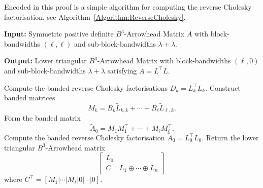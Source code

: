 \documentclass[hidelinks,onefignum,onetabnum]{siamart220329}
\def\algref#1{Algorithm~\ref{Algorithm:#1}}
\begin{document}
Encoded in this proof is a simple algorithm for computing the reverse Cholesky factorisation, see \algref{ReverseCholesky}. 



\begin{algorithm}[tb]
\caption{Reverse Cholesky for $B^3$-Arrowhead Matrices}\label{Algorithm:ReverseCholesky}

{\noindent\bf Input:} {Symmetric positive definite $B^3$-Arrowhead Matrix $A$ with block-bandwidths $(\ell,\ell)$ and sub-block-bandwidths $\lambda+\lambda$.}

{\noindent\bf Output:} {Lower triangular $B^3$-Arrowhead Matrix with block-bandwidths $(\ell,0)$ and sub-block-bandwidths $\lambda+\lambda$ satisfying $A = L^\top L$.}

\begin{algorithmic}[1]
\STATE Compute the banded reverse Cholesky factorisations $D_k = L_k^\top L_k$.
\ENDFOR
{}
\STATE Construct banded matrices 
\[
	M_k = B_k  \tilde L_{k,k} + \cdots + B_\ell \tilde L_{\ell,k}.
\]
\ENDFOR
\STATE Form the banded matrix
\[
	\tilde A_0  = M_1 M_1^\top + \cdots + M_\ell M_\ell^\top.
\]
\STATE Compute the banded reverse Cholesky factorisation $ \tilde A_0 = L_0^\top L_0$.
\STATE Return the lower triangular $B^3$-Arrowhead matrix
\[
	\begin{bmatrix} L_0 \\
		C & L_1 \oplus \cdots \oplus L_n
	\end{bmatrix}
\]
where $C^\top = [M_1 | \cdots | M_\ell | 0 | \cdots | 0]$.
\end{algorithmic}
\end{algorithm}
\end{document}
